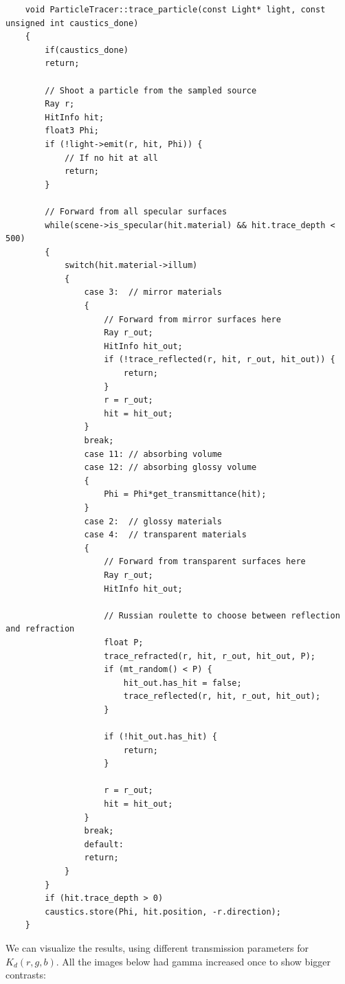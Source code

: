 \documentclass[a4,12pt]{article}
\begin{document}
	\begin{lstlisting}
	void ParticleTracer::trace_particle(const Light* light, const unsigned int caustics_done)
	{
		if(caustics_done)
		return;
		
		// Shoot a particle from the sampled source
		Ray r;
		HitInfo hit;
		float3 Phi;
		if (!light->emit(r, hit, Phi)) {
			// If no hit at all
			return;
		}
		
		// Forward from all specular surfaces
		while(scene->is_specular(hit.material) && hit.trace_depth < 500)
		{
			switch(hit.material->illum)
			{
				case 3:  // mirror materials
				{
					// Forward from mirror surfaces here
					Ray r_out;
					HitInfo hit_out;
					if (!trace_reflected(r, hit, r_out, hit_out)) {
						return;
					}
					r = r_out;
					hit = hit_out;
				}
				break;
				case 11: // absorbing volume
				case 12: // absorbing glossy volume
				{
					Phi = Phi*get_transmittance(hit);
				}
				case 2:  // glossy materials
				case 4:  // transparent materials
				{
					// Forward from transparent surfaces here
					Ray r_out;
					HitInfo hit_out;
					
					// Russian roulette to choose between reflection and refraction
					float P;
					trace_refracted(r, hit, r_out, hit_out, P);
					if (mt_random() < P) {
						hit_out.has_hit = false;
						trace_reflected(r, hit, r_out, hit_out);
					}
					
					if (!hit_out.has_hit) {
						return;
					}
					
					r = r_out;
					hit = hit_out;
				}
				break;
				default:
				return;
			}
		}
		if (hit.trace_depth > 0)
		caustics.store(Phi, hit.position, -r.direction);
	}
	\end{lstlisting}
	
	We can visualize the results, using different transmission parameters for $K_d(r, g, b)$. All the images below had gamma increased once to show bigger contrasts:
	
\end{document}
